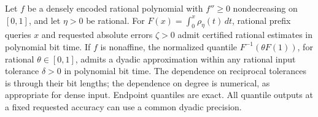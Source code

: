 \begin{lemma}
\label{lem:certified-curvature}
Let $f$ be a densely encoded rational polynomial with
$f''\ge0$ nondecreasing on $[0,1]$, and let $\eta>0$ be rational.
For $F(x)=\int_0^x\rho_\eta(t)\,dt$, rational prefix queries $x$ and
requested absolute errors $\zeta>0$ admit certified rational estimates
in polynomial bit time. If $f$ is nonaffine, the normalized quantile
$F^{-1}(\theta F(1))$, for rational $\theta\in[0,1]$, admits a dyadic
approximation within any rational input tolerance $\delta>0$ in
polynomial bit time. The dependence on reciprocal tolerances is through
their bit lengths; the dependence on degree is numerical, as appropriate
for dense input. Endpoint quantiles are exact. All quantile outputs at
a fixed requested accuracy can use a common dyadic precision.
\end{lemma}
